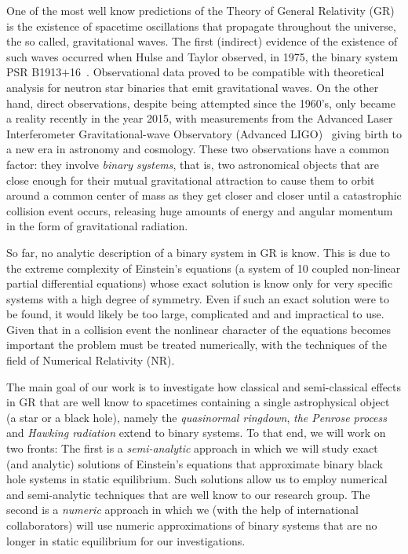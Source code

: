 One of the most well know predictions of the Theory of General Relativity (GR) is the existence of spacetime oscillations that propagate throughout the universe, the so called, gravitational waves. The first (indirect) evidence of the existence of such waves occurred when Hulse and Taylor observed, in 1975, the binary system PSR B1913$+$16~\cite{1975ApJ...195L..51H}. Observational data proved to be compatible with theoretical analysis for neutron star binaries that emit gravitational waves. On the other hand, direct observations, despite being attempted since the 1960's, only became a reality recently in the year 2015, with measurements from the Advanced Laser Interferometer Gravitational-wave Observatory (Advanced LIGO)~\cite{grav1,grav2} giving birth to a new era in astronomy and cosmology. These two observations have a common factor: they involve \emph{binary systems}, that is, two astronomical objects that are close enough for their mutual gravitational attraction to cause them to orbit around a common center of mass as they get closer and closer until a catastrophic collision event occurs, releasing huge amounts of energy and angular momentum in the form of gravitational radiation.

So far, no analytic description of a binary system in GR is know. This is due to the extreme complexity of Einstein's equations (a system of 10 coupled non-linear partial differential equations) whose exact solution is know only for very specific systems with a high degree of symmetry. Even if such an exact solution were to be found, it would likely be too large, complicated and and impractical to use. Given that in a collision event the nonlinear character of the equations becomes important the problem must be treated numerically, with the techniques of the field of Numerical Relativity (NR).

The main goal of our work is to investigate how classical and semi-classical effects in GR that are well know to spacetimes containing a single astrophysical object (a star or a black hole), namely the \emph{quasinormal ringdown}, \emph{the Penrose process} and \emph{Hawking radiation} extend to binary systems. To that end, we will work on two fronts: The first is a \emph{semi-analytic} approach in which we will study exact (and analytic) solutions of Einstein's equations that approximate binary black hole systems in static equilibrium. Such solutions allow us to employ numerical and semi-analytic techniques that are well know to our research group. The second is a \emph{numeric} approach in which we (with the help of international collaborators) will use numeric approximations of binary systems that are no longer in static equilibrium for our investigations.

